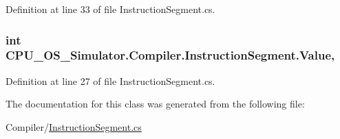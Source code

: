 Definition at line 33 of file Instruction\+Segment.\+cs.

\hypertarget{class_c_p_u___o_s___simulator_1_1_compiler_1_1_instruction_segment_a1e8c5f60cda7233d75e61d44cc43b6b8}{}
\subsubsection[{Value}]{\setlength{\rightskip}{0pt plus 5cm}int C\+P\+U\+\_\+\+O\+S\+\_\+\+Simulator.\+Compiler.\+Instruction\+Segment.\+Value\hspace{0.3cm}{\ttfamily [get]}, {\ttfamily [set]}}\label{class_c_p_u___o_s___simulator_1_1_compiler_1_1_instruction_segment_a1e8c5f60cda7233d75e61d44cc43b6b8}


Definition at line 27 of file Instruction\+Segment.\+cs.



The documentation for this class was generated from the following file\+:\begin{DoxyCompactItemize}
\item 
Compiler/\hyperlink{_instruction_segment_8cs}{Instruction\+Segment.\+cs}\end{DoxyCompactItemize}
